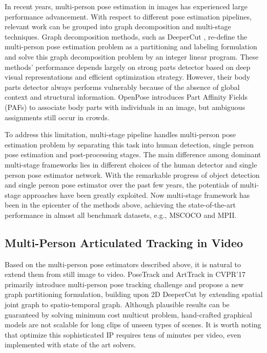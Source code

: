\documentclass{bmvc2k}
\begin{document}
In recent years, multi-person pose estimation in images has experienced large performance advancement. With respect to different pose estimation pipelines, relevant work can be grouped into graph decomposition and multi-stage techniques. Graph decomposition methods, such as DeeperCut \cite{insafutdinov2016deepercut}, re-define the multi-person pose estimation problem as a partitioning and labeling formulation and solve this graph decomposition problem by an integer linear program. These methods' performance depends largely on strong parts detector based on deep visual representations and efficient optimization strategy. However, their body parts detector always performs vulnerably because of the absence of global context and structural information. OpenPose \cite{cao2017realtime} introduces Part Affinity Fields (PAFs) to associate body parts with individuals in an image, but ambiguous assignments still occur in crowds. 

To address this limitation, multi-stage pipeline \cite{fang2017rmpe,chen2017cascaded} handles multi-person pose estimation problem by separating this task into human detection, single person pose estimation and post-processing stages. The main difference among dominant multi-stage frameworks lies in different choices of the human detector and single person pose estimator network. With the remarkable progress of object detection and single person pose estimator over the past few years, the potentials of multi-stage approaches have been greatly exploited. Now multi-stage framework has been in the epicenter of the methods above, achieving the state-of-the-art performance in almost all benchmark datasets, e.g., MSCOCO\cite{lin2014microsoft} and MPII\cite{andriluka14cvpr}.
\vspace{-2mm}
\subsection{Multi-Person Articulated Tracking in Video}
Based on the multi-person pose estimators described above, it is natural to extend them from still image to video. PoseTrack \cite{iqbal2017posetrack} and ArtTrack \cite{insafutdinov2017arttrack} in CVPR'17 primarily introduce multi-person pose tracking challenge and propose a new graph partitioning formulation, building upon 2D DeeperCut  \cite{insafutdinov2016deepercut} by extending spatial joint graph to spatio-temporal graph. Although plausible results can be guaranteed by solving minimum cost multicut problem, hand-crafted graphical models are not scalable for long clips of unseen types of scenes. It is worth noting that optimize this sophisticated IP requires tens of minutes per video, even implemented with state of the art solvers.  
\end{document}
